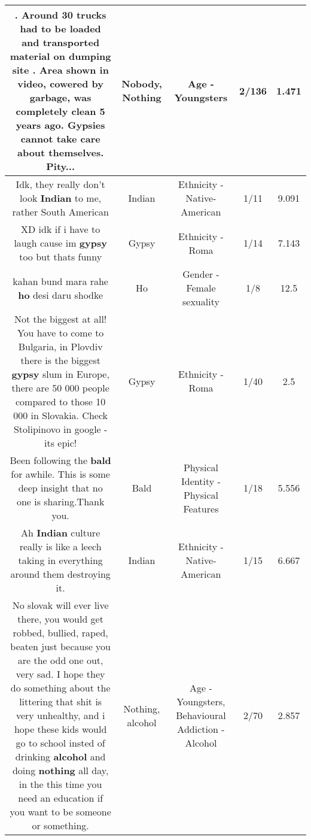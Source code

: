 \documentclass[11pt]{article}
\newlength\mylength
\begin{document}
\begin{center}
\begin{longtable}{|C{.65\mylength}|C{.30\mylength}|C{.12\mylength}|C{.12\mylength}|C{.12\mylength}|}
. Around 30 trucks had to be loaded and transported material on dumping site
. Area shown in video, cowered by garbage, was completely clean 5 years ago. Gypsies cannot take care about themselves. Pity...\normalsize   & Nobody, Nothing & Age - Youngsters & 2/136 & 1.471 \\  \hline
  \small Idk, they really don't look \textbf{Indian} to me, rather South American\normalsize   & Indian & Ethnicity - Native-American & 1/11 & 9.091 \\  \hline
  \small XD idk if i have to laugh cause im \textbf{gypsy} too but thats funny\normalsize   & Gypsy & Ethnicity - Roma & 1/14 & 7.143 \\  \hline
  \small kahan bund mara rahe \textbf{ho} desi daru shodke\normalsize   & Ho & Gender - Female sexuality & 1/8 & 12.5 \\  \hline
  \small Not the biggest at all! You have to come to Bulgaria, in Plovdiv there is the biggest \textbf{gypsy} slum in Europe,  there are 50 000 people compared to those 10 000 in Slovakia. Check Stolipinovo in google - its epic!\normalsize   & Gypsy & Ethnicity - Roma & 1/40 & 2.5 \\  \hline
  \small Been following the \textbf{bald} for awhile.  This is some deep insight that no one is sharing.Thank you.\normalsize   & Bald & Physical Identity - Physical Features & 1/18 & 5.556 \\  \hline
  \small Ah \textbf{Indian} culture really is like a leech taking in everything around them destroying it.\normalsize   & Indian & Ethnicity - Native-American & 1/15 & 6.667 \\  \hline
  \small No slovak will ever live there, you would get robbed, bullied, raped, beaten just because you are the odd one out, very sad. I hope they do something about the littering that shit is very unhealthy, and i hope these kids would go to school insted of drinking \textbf{alcohol} and doing \textbf{nothing} all day, in the this time you need an education if you want to be someone or something.\normalsize   & Nothing, alcohol & Age - Youngsters, Behavioural Addiction - Alcohol & 2/70 & 2.857 \\  \hline

\end{longtable}
\end{center}
\end{document}
